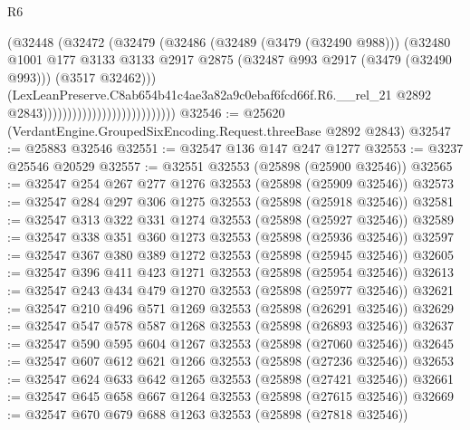 \begin{lexlean}{R6}
\begin{coremodule}
                                                  (@32448
                                                    (@32472
                                                      (@32479
                                                        (@32486
                                                          (@32489 (@3479 (@32490 @988)))
                                                          (@32480
                                                            @1001
                                                            @177
                                                            @3133
                                                            @3133
                                                            @2917
                                                            @2875
                                                            (@32487
                                                              @993
                                                              @2917
                                                              (@3479 (@32490 @993)))
                                                            (@3517 @32462)))
                                                        (LexLeanPreserve.C8ab654b41c4ae3a82a9c0ebaf6fcd66f.R6.__rel_21
                                                          @2892
                                                          @2843)))))))))))))))))))))))))))
@32546 := @25620 (VerdantEngine.GroupedSixEncoding.Request.threeBase @2892 @2843)
@32547 := @25883 @32546
@32551 := @32547 @136 @147 @247 @1277
@32553 := @3237 @25546 @20529
@32557 := @32551 @32553 (@25898 (@25900 @32546))
@32565 := @32547 @254 @267 @277 @1276 @32553 (@25898 (@25909 @32546))
@32573 := @32547 @284 @297 @306 @1275 @32553 (@25898 (@25918 @32546))
@32581 := @32547 @313 @322 @331 @1274 @32553 (@25898 (@25927 @32546))
@32589 := @32547 @338 @351 @360 @1273 @32553 (@25898 (@25936 @32546))
@32597 := @32547 @367 @380 @389 @1272 @32553 (@25898 (@25945 @32546))
@32605 := @32547 @396 @411 @423 @1271 @32553 (@25898 (@25954 @32546))
@32613 := @32547 @243 @434 @479 @1270 @32553 (@25898 (@25977 @32546))
@32621 := @32547 @210 @496 @571 @1269 @32553 (@25898 (@26291 @32546))
@32629 := @32547 @547 @578 @587 @1268 @32553 (@25898 (@26893 @32546))
@32637 := @32547 @590 @595 @604 @1267 @32553 (@25898 (@27060 @32546))
@32645 := @32547 @607 @612 @621 @1266 @32553 (@25898 (@27236 @32546))
@32653 := @32547 @624 @633 @642 @1265 @32553 (@25898 (@27421 @32546))
@32661 := @32547 @645 @658 @667 @1264 @32553 (@25898 (@27615 @32546))
@32669 := @32547 @670 @679 @688 @1263 @32553 (@25898 (@27818 @32546))

\end{coremodule}
\end{lexlean}
